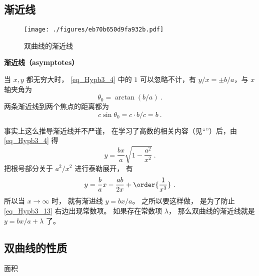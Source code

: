 \subsection{渐近线}
\begin{figure}[ht]
\centering
\texttt{[image: ./figures/eb70b650d9fa932b.pdf]}
\caption{双曲线的渐近线} \label{fig_Hypb3_1}
\end{figure}
\textbf{渐近线（asymptotes）}

当 $x,y$ 都无穷大时， \autoref{eq_Hypb3_4} 中的 $1$ 可以忽略不计，有 $y/x = \pm b/a$，与 $x$ 轴夹角为
\begin{equation}\label{eq_Hypb3_1}
\theta_0 = \arctan(b/a)~.
\end{equation}
两条渐近线到两个焦点的距离都为
\begin{equation}\label{eq_Hypb3_11}
c\sin\theta_0 = c\cdot b/c = b~.
\end{equation}


事实上这么推导渐近线并不严谨， 在学习了高数的相关内容（见“”）后，由\autoref{eq_Hypb3_4} 得
\begin{equation}
y = \frac{bx}{a} \sqrt{1-\frac{a^2}{x^2}}~.
\end{equation}
把根号部分关于 $a^2/x^2$ 进行泰勒展开， 有
\begin{equation}\label{eq_Hypb3_13}
y = \frac ba x - \frac{ab}{2x} + \order{\frac{1}{x^3}}~.
\end{equation}
所以当 $x\to\infty$ 时， 就有渐进线 $y = bx/a$。 之所以要这样做， 是为了防止\autoref{eq_Hypb3_13} 右边出现常数项。 如果存在常数项 $\lambda$， 那么双曲线的渐近线就是 $y = bx/a + \lambda$ 了。

\subsection{双曲线的性质}
面积









